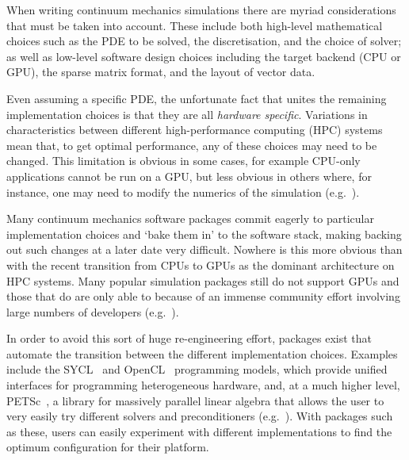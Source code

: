 \documentclass[thesis]{subfiles}
\begin{document}
When writing continuum mechanics simulations there are myriad considerations that must be taken into account.
These include both high-level mathematical choices such as the PDE to be solved, the discretisation, and the choice of solver; as well as low-level software design choices including the target backend (CPU or GPU), the sparse matrix format, and the layout of vector data.

Even assuming a specific PDE, the unfortunate fact that unites the remaining implementation choices is that they are all \emph{hardware specific}.
Variations in characteristics between different high-performance computing (HPC) systems mean that, to get optimal performance, any of these choices may need to be changed.
This limitation is obvious in some cases, for example CPU-only applications cannot be run on a GPU, but less obvious in others where, for instance, one may need to modify the numerics of the simulation (e.g.~\cite{betteridgeCodeGenerationProductive2021}).

Many continuum mechanics software packages commit eagerly to particular implementation choices and `bake them in' to the software stack, making backing out such changes at a later date very difficult.
Nowhere is this more obvious than with the recent transition from CPUs to GPUs as the dominant architecture on HPC systems.
Many popular simulation packages still do not support GPUs and those that do are only able to because of an immense community effort involving large numbers of developers (e.g.~\cite{millsPETScTAODevelopments2024,millsPerformancePortablePETScGPUbased2020,brownLibCEEDFastAlgebra2021,abdelfattahGPUAlgorithmsEfficient2021}).

In order to avoid this sort of huge re-engineering effort, packages exist that automate the transition between the different implementation choices.
Examples include the SYCL~\cite{SYCL2020Specification2020} and OpenCL~\cite{stoneOpenCLParallelProgramming2010} programming models, which provide unified interfaces for programming heterogeneous hardware, and, at a much higher level, PETSc~\cite{petsc-user-ref,petsc-web-page,petsc-efficient}, a library for massively parallel linear algebra that allows the user to very easily try different solvers and preconditioners (e.g.~\cite{brownComposableLinearSolvers2012,smithPETScSoftwareStrategy}).
With packages such as these, users can easily experiment with different implementations to find the optimum configuration for their platform.
\end{document}
